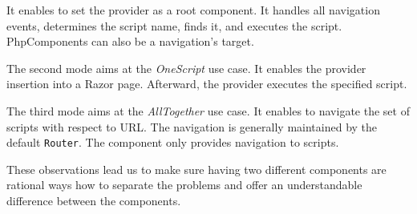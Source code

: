 It enables to set the provider as a root component.
It handles all navigation events, determines the script name, finds it, and executes the script.
PhpComponents can also be a navigation's target.
\par
The second mode aims at the \textit{OneScript} use case.
It enables the provider insertion into a Razor page.
Afterward, the provider executes the specified script.
\par
The third mode aims at the \textit{AllTogether} use case.
It enables to navigate the set of scripts with respect to URL.
The navigation is generally maintained by the default \texttt{Router}.
The component only provides navigation to scripts.
\par
These observations lead us to make sure having two different components are rational ways how to separate the problems and offer an understandable difference between the components.


